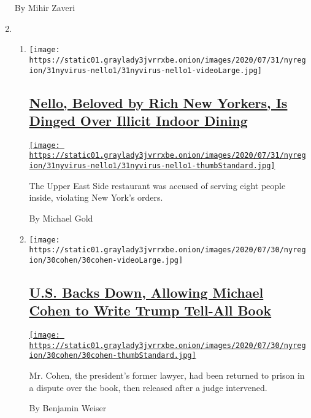 \begin{enumerate}
  By Mihir Zaveri
\item
  \begin{enumerate}
  \def\labelenumii{\arabic{enumii}.}
  \item
    \texttt{[image: https://static01.graylady3jvrrxbe.onion/images/2020/07/31/nyregion/31nyvirus-nello1/31nyvirus-nello1-videoLarge.jpg]}

    \hypertarget{nello-beloved-by-rich-new-yorkers-is-dinged-over-illicit-indoor-dining}{%
    \subsection{\texorpdfstring{\href{/2020/07/31/nyregion/nello-liquor-license-suspended.html}{Nello,
    Beloved by Rich New Yorkers, Is Dinged Over Illicit Indoor
    Dining}}{Nello, Beloved by Rich New Yorkers, Is Dinged Over Illicit Indoor Dining}}\label{nello-beloved-by-rich-new-yorkers-is-dinged-over-illicit-indoor-dining}}

    \href{/2020/07/31/nyregion/nello-liquor-license-suspended.html}{\texttt{[image: https://static01.graylady3jvrrxbe.onion/images/2020/07/31/nyregion/31nyvirus-nello1/31nyvirus-nello1-thumbStandard.jpg]}}

    The Upper East Side restaurant was accused of serving eight people
    inside, violating New York's orders.

    By Michael Gold
  \item
    \texttt{[image: https://static01.graylady3jvrrxbe.onion/images/2020/07/30/nyregion/30cohen/30cohen-videoLarge.jpg]}

    \hypertarget{us-backs-down-allowing-michael-cohen-to-write-trump-tell-all-book}{%
    \subsection{\texorpdfstring{\href{/2020/07/30/nyregion/michael-cohen-donald-trump-book.html}{U.S.
    Backs Down, Allowing Michael Cohen to Write Trump Tell-All
    Book}}{U.S. Backs Down, Allowing Michael Cohen to Write Trump Tell-All Book}}\label{us-backs-down-allowing-michael-cohen-to-write-trump-tell-all-book}}

    \href{/2020/07/30/nyregion/michael-cohen-donald-trump-book.html}{\texttt{[image: https://static01.graylady3jvrrxbe.onion/images/2020/07/30/nyregion/30cohen/30cohen-thumbStandard.jpg]}}

    Mr. Cohen, the president's former lawyer, had been returned to
    prison in a dispute over the book, then released after a judge
    intervened.

    By Benjamin Weiser
  \end{enumerate}
\end{enumerate}

